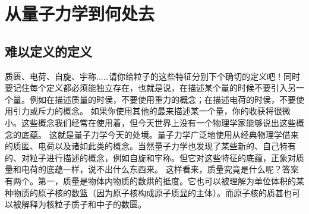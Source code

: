 \chapter{从量子力学到何处去}

\section{难以定义的定义}

质匮、电荷、自旋、宇称...…请你给粒子的这些特征分别下个确切的定义吧！同时要记住每个定义都必须能独立存在，也就是说，在描述某个量的时候不要引入另一个量。例如在描述质量的时侯，不要使用重力的概念；在描述电荷的时侯，不要使用引力或斥力的概念。
如果你使用其他的最来描述某一个量，你的收获将很微小。这些概念我们经常在使用着，但今天世界上没有一个物理学家能够说出这些概念的底蕴。
这就是量子力学今天的处境。量子力学广泛地使用从经典物理学借来的质匿、电荷以及诸如此类的概念。当然量子力学也发现了某些新的、自己特有的、对粒子进行描述的概念，例如自旋和宇称。但它对这些特征的底蕴，正象对质量和电荷的底蕴一样，说不出什么东西来。
这样看来，质量究竟是什么呢？答案有两个。第一，质量是物体内物质的数烘的抵度。它也可以被理解为单位体积的某种物质的原子核的数篮（因为原子核构成原子质显的主体）。而原子核的质甚也可以被解释为核粒子质子和中子的数匮。

